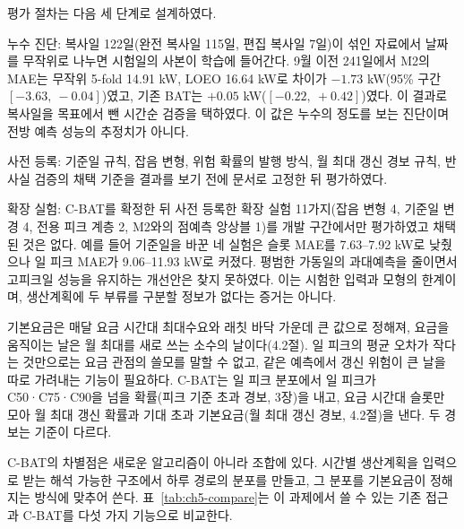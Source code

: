 평가 절차는 다음 세 단계로 설계하였다.
\begin{hwplist}
\item 누수 진단: 복사일 122일(완전 복사일 115일, 편집 복사일 7일)이 섞인 자료에서 날짜를 무작위로 나누면 시험일의 사본이 학습에 들어간다. 9월 이전 241일에서 M2의 MAE는 무작위 5-fold 14.91 kW, LOEO 16.64 kW로 차이가 $-1.73$ kW(95\% 구간 $[-3.63,\ -0.04]$)였고, 기존 BAT는 $+0.05$ kW($[-0.22,\ +0.42]$)였다. 이 결과로 복사일을 목표에서 뺀 시간순 검증을 택하였다. 이 값은 누수의 정도를 보는 진단이며 전방 예측 성능의 추정치가 아니다.
\item 사전 등록: 기준일 규칙, 잡음 변형, 위험 확률의 발행 방식, 월 최대 갱신 경보 규칙, 반사실 검증의 채택 기준을 결과를 보기 전에 문서로 고정한 뒤 평가하였다.
\item 확장 실험: C-BAT를 확정한 뒤 사전 등록한 확장 실험 11가지(잡음 변형 4, 기준일 변경 4, 전용 피크 계층 2, M2와의 점예측 앙상블 1)를 개발 구간에서만 평가하였고 채택된 것은 없다. 예를 들어 기준일을 바꾼 네 실험은 슬롯 MAE를 7.63--7.92 kW로 낮췄으나 일 피크 MAE가 9.06--11.93 kW로 커졌다. 평범한 가동일의 과대예측을 줄이면서 고피크일 성능을 유지하는 개선안은 찾지 못하였다. 이는 시험한 입력과 모형의 한계이며, 생산계획에 두 부류를 구분할 정보가 없다는 증거는 아니다.
\end{hwplist}


기본요금은 매달 요금 시간대 최대수요와 래칫 바닥 가운데 큰 값으로 정해져, 요금을 움직이는 날은 월 최대를 새로 쓰는 소수의 날이다(4.2절). 일 피크의 평균 오차가 작다는 것만으로는 요금 관점의 쓸모를 말할 수 없고, 같은 예측에서 갱신 위험이 큰 날을 따로 가려내는 기능이 필요하다. C-BAT는 일 피크 분포에서 일 피크가 C50·C75·C90을 넘을 확률(피크 기준 초과 경보, 3장)을 내고, 요금 시간대 슬롯만 모아 월 최대 갱신 확률과 기대 초과 기본요금(월 최대 갱신 경보, 4.2절)을 낸다. 두 경보는 기준이 다르다.

C-BAT의 차별점은 새로운 알고리즘이 아니라 조합에 있다. 시간별 생산계획을 입력으로 받는 해석 가능한 구조에서 하루 경로의 분포를 만들고, 그 분포를 기본요금이 정해지는 방식에 맞추어 쓴다. 표~\ref{tab:ch5-compare}는 이 과제에서 쓸 수 있는 기존 접근과 C-BAT를 다섯 가지 기능으로 비교한다.

